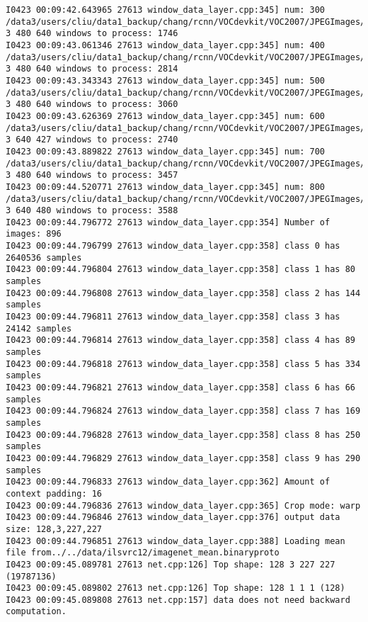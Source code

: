 \documentclass[a4]{article}
\begin{document}
\begin{lstlisting}
I0423 00:09:42.643965 27613 window_data_layer.cpp:345] num: 300 /data3/users/cliu/data1_backup/chang/rcnn/VOCdevkit/VOC2007/JPEGImages/COCO_val2014_000000206049.jpg 3 480 640 windows to process: 1746
I0423 00:09:43.061346 27613 window_data_layer.cpp:345] num: 400 /data3/users/cliu/data1_backup/chang/rcnn/VOCdevkit/VOC2007/JPEGImages/COCO_val2014_000000265611.jpg 3 480 640 windows to process: 2814
I0423 00:09:43.343343 27613 window_data_layer.cpp:345] num: 500 /data3/users/cliu/data1_backup/chang/rcnn/VOCdevkit/VOC2007/JPEGImages/COCO_val2014_000000331712.jpg 3 480 640 windows to process: 3060
I0423 00:09:43.626369 27613 window_data_layer.cpp:345] num: 600 /data3/users/cliu/data1_backup/chang/rcnn/VOCdevkit/VOC2007/JPEGImages/COCO_val2014_000000408071.jpg 3 640 427 windows to process: 2740
I0423 00:09:43.889822 27613 window_data_layer.cpp:345] num: 700 /data3/users/cliu/data1_backup/chang/rcnn/VOCdevkit/VOC2007/JPEGImages/COCO_val2014_000000470121.jpg 3 480 640 windows to process: 3457
I0423 00:09:44.520771 27613 window_data_layer.cpp:345] num: 800 /data3/users/cliu/data1_backup/chang/rcnn/VOCdevkit/VOC2007/JPEGImages/COCO_val2014_000000550273.jpg 3 640 480 windows to process: 3588
I0423 00:09:44.796772 27613 window_data_layer.cpp:354] Number of images: 896
I0423 00:09:44.796799 27613 window_data_layer.cpp:358] class 0 has 2640536 samples
I0423 00:09:44.796804 27613 window_data_layer.cpp:358] class 1 has 80 samples
I0423 00:09:44.796808 27613 window_data_layer.cpp:358] class 2 has 144 samples
I0423 00:09:44.796811 27613 window_data_layer.cpp:358] class 3 has 24142 samples
I0423 00:09:44.796814 27613 window_data_layer.cpp:358] class 4 has 89 samples
I0423 00:09:44.796818 27613 window_data_layer.cpp:358] class 5 has 334 samples
I0423 00:09:44.796821 27613 window_data_layer.cpp:358] class 6 has 66 samples
I0423 00:09:44.796824 27613 window_data_layer.cpp:358] class 7 has 169 samples
I0423 00:09:44.796828 27613 window_data_layer.cpp:358] class 8 has 250 samples
I0423 00:09:44.796829 27613 window_data_layer.cpp:358] class 9 has 290 samples
I0423 00:09:44.796833 27613 window_data_layer.cpp:362] Amount of context padding: 16
I0423 00:09:44.796836 27613 window_data_layer.cpp:365] Crop mode: warp
I0423 00:09:44.796846 27613 window_data_layer.cpp:376] output data size: 128,3,227,227
I0423 00:09:44.796851 27613 window_data_layer.cpp:388] Loading mean file from../../data/ilsvrc12/imagenet_mean.binaryproto
I0423 00:09:45.089781 27613 net.cpp:126] Top shape: 128 3 227 227 (19787136)
I0423 00:09:45.089802 27613 net.cpp:126] Top shape: 128 1 1 1 (128)
I0423 00:09:45.089808 27613 net.cpp:157] data does not need backward computation.

\end{lstlisting}
\end{document}
